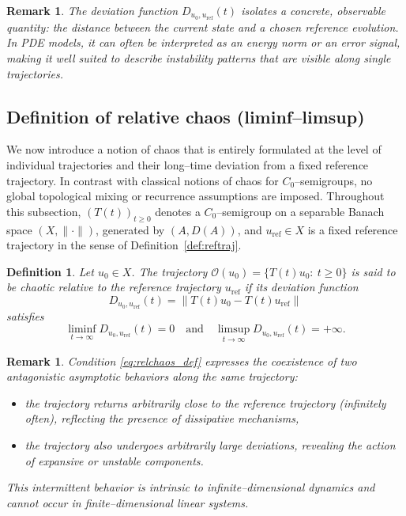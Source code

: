 \documentclass[12pt]{article}
\newtheorem{definition}[theorem]{Definition}
\newtheorem{remark}[theorem]{Remark}
\begin{document}
\begin{remark}\label{rem:why_deviation}
The deviation function $D_{u_0,u_{\mathrm{ref}}}(t)$ isolates a concrete, observable quantity: the distance between the current state and a chosen reference evolution. In PDE models, it can often be interpreted as an energy norm or an error signal, making it well suited to describe instability patterns that are visible along single trajectories.
\end{remark}


\subsection{Definition of relative chaos (liminf--limsup)}

We now introduce a notion of chaos that is entirely formulated at the level of individual trajectories and their long--time deviation from a fixed reference trajectory. In contrast with classical notions of chaos for $C_0$--semigroups, no global topological mixing or recurrence assumptions are imposed. Throughout this subsection, $(T(t))_{t\ge 0}$ denotes a $C_0$--semigroup on a separable Banach space $(X,\|\cdot\|)$, generated by $(A,D(A))$, and $u_{\mathrm{ref}}\in X$ is a fixed reference trajectory in the sense of Definition~\ref{def:reftraj}.



\begin{definition}\label{def:reltraj}
Let $u_0\in X$. The trajectory $\mathcal{O}(u_0)=\{T(t)u_0:\ t\ge 0\}$ is said to be \emph{chaotic relative to the reference trajectory $u_{\mathrm{ref}}$} if its deviation function
\[
D_{u_0,u_{\mathrm{ref}}}(t)=\|T(t)u_0-T(t)u_{\mathrm{ref}}\|
\]
satisfies
\begin{equation}\label{eq:relchaos_def}
\liminf_{t\to\infty} D_{u_0,u_{\mathrm{ref}}}(t)=0
\quad\text{and}\quad
\limsup_{t\to\infty} D_{u_0,u_{\mathrm{ref}}}(t)=+\infty.
\end{equation}
\end{definition}

\begin{remark}\label{rem:liminflimsup_interpretation}
Condition \eqref{eq:relchaos_def} expresses the coexistence of two antagonistic asymptotic behaviors along the same trajectory:
\begin{itemize}
\item the trajectory returns arbitrarily close to the reference trajectory (infinitely often), reflecting the presence of dissipative mechanisms,
\item the trajectory also undergoes arbitrarily large deviations, revealing the action of expansive or unstable components.
\end{itemize}
This intermittent behavior is intrinsic to infinite--dimensional dynamics and cannot occur in finite--dimensional linear systems.
\end{remark}
\end{document}

